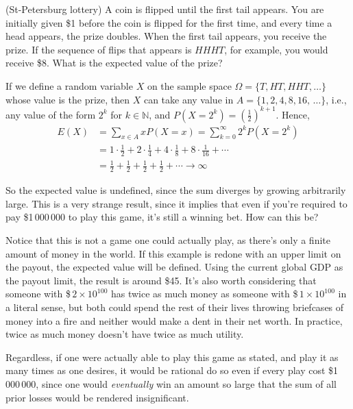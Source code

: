 \begin{example}
(St-Petersburg lottery) A coin is flipped until the first tail appears. You are initially given \$1 before the coin is flipped for the first time, and every time a head appears, the prize doubles. When the first tail appears, you receive the prize. If the sequence of flips that appears is $HHHT$, for example, you would receive \$8. What is the expected value of the prize?

If we define a random variable $X$ on the sample space $\Omega = \{T, HT, HHT, \dots\}$ whose value is the prize, then $X$ can take any value in $A = \{1,2,4,8,16, \,\dots\}$, i.e., any value of the form $2^k$ for $k \in \mathbb{N}$, and $P(X = 2^k) = \left(\frac{1}{2}\right)^{k+1}$. Hence,
$$\begin{aligned}E(X) &= \sum_{x \in A} x P(X = x) = \sum_{k = 0}^{\infty} 2^k P(X = 2^k) \\
&= 1 \cdot \frac{1}{2} + 2 \cdot \frac{1}{4} + 4 \cdot \frac{1}{8} + 8 \cdot \frac{1}{16}  + \cdots \\
&= \frac{1}{2} + \frac{1}{2} + \frac{1}{2} + \frac{1}{2} + \cdots \rightarrow \infty\end{aligned}$$
\end{example}

So the expected value is undefined, since the sum diverges by growing arbitrarily large.  This is a very strange result, since it implies that even if you're required to pay \$1\,000\,000 to play this game, it's still a winning bet. How can this be?

Notice that this is not a game one could actually play, as there's only a finite amount of money in the world. If this example is redone with an upper limit on the payout, the expected value will be defined. Using the current global GDP as the payout limit, the result is around \$45. It's also worth considering that someone with \$\,$2 \times 10^{100}$ has twice as much money as someone with \$\,$1 \times 10^{100}$ in a literal sense, but both could spend the rest of their lives throwing briefcases of money into a fire and neither would make a dent in their net worth. In practice, twice as much money doesn't have twice as much utility. 

Regardless, if one were actually able to play this game as stated, and play it as many times as one desires, it would be rational do so even if every play cost \$1\,000\,000, since one would \emph{eventually} win an amount so large that the sum of all prior losses would be rendered insignificant.

